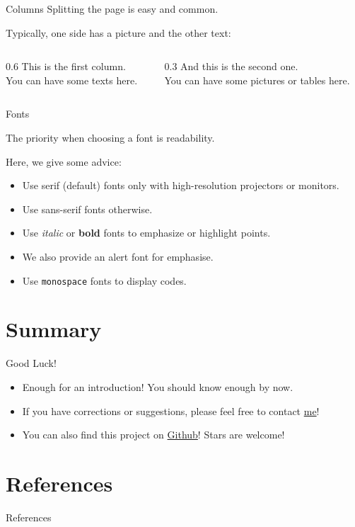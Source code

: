 \documentclass[10pt,aspectratio=169]{beamer}
\begin{document}
\begin{frame}{Columns}
	Splitting the page is easy and common.

	Typically, one side has a picture and the other text:
	
	\vspace{20pt}
	
	\begin{columns}
\begin{column}{0.6\textwidth}
			This is the first column.\\[10pt]
			You can have some texts here.
\end{column}
		
		\begin{column}{0.3\textwidth}
			And this is the second one.\\[10pt]
			You can have some pictures or tables here.
\end{column}
	\end{columns}

\end{frame}

\begin{frame}{Fonts}

The priority when choosing a font is readability.
	
	Here, we give some advice:
\begin{itemize}
  \item Use serif (default) fonts only with high-resolution projectors or monitors.
		\item Use \textsf{sans-serif} fonts otherwise.
		\item Use \textit{italic} or \textbf{bold} fonts to emphasize or highlight points.
		\item We also provide an \alert{alert} font for emphasise.
  \item Use \texttt{monospace} fonts to display codes.
	\end{itemize}

\end{frame}

\section{Summary}

\begin{frame}{Good Luck!}
	\begin{itemize}
		\item Enough for an introduction! You should know enough by now.
  \item If you have corrections or suggestions, please feel free to contact \href{mailto:ruisong20@gmail.com}{me}!
        \item You can also find this project on \href{https://github.com/wurahara/PolyU-Beamer-Slides}{Github}! Stars are welcome!
\end{itemize}
\end{frame}

\section{References}
\begin{frame}[allowframebreaks]{References}
  
  
\end{frame}

\backmatter %
\end{document}
